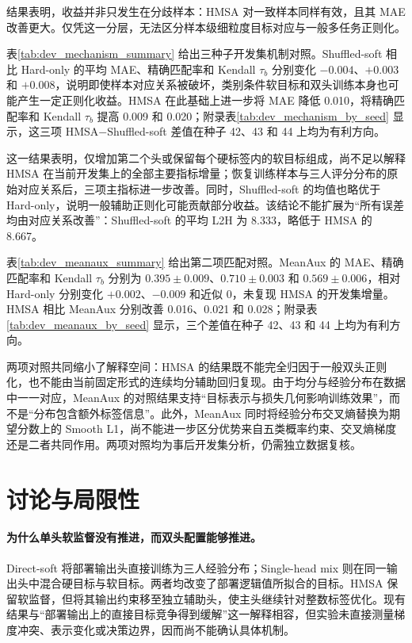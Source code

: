 \documentclass[UTF8,fontset=fandol,a4paper,11pt]{ctexart}
\begin{document}
结果表明，收益并非只发生在分歧样本：HMSA 对一致样本同样有效，且其 MAE 改善更大。仅凭这一分层，无法区分样本级细粒度目标对应与一般多任务正则化。

表\ref{tab:dev_mechanism_summary} 给出三种子开发集机制对照。Shuffled-soft 相比 Hard-only 的平均 MAE、精确匹配率和 Kendall $\tau_b$ 分别变化 $-0.004$、$+0.003$ 和 $+0.008$，说明即使样本对应关系被破坏，类别条件软目标和双头训练本身也可能产生一定正则化收益。HMSA 在此基础上进一步将 MAE 降低 0.010，将精确匹配率和 Kendall $\tau_b$ 提高 0.009 和 0.020；附录表\ref{tab:dev_mechanism_by_seed} 显示，这三项 HMSA$-$Shuffled-soft 差值在种子 42、43 和 44 上均为有利方向。



这一结果表明，仅增加第二个头或保留每个硬标签内的软目标组成，尚不足以解释 HMSA 在当前开发集上的全部主要指标增量；恢复训练样本与三人评分分布的原始对应关系后，三项主指标进一步改善。同时，Shuffled-soft 的均值也略优于 Hard-only，说明一般辅助正则化可能贡献部分收益。该结论不能扩展为“所有误差均由对应关系改善”：Shuffled-soft 的平均 L2H 为 8.333，略低于 HMSA 的 8.667。

表\ref{tab:dev_meanaux_summary} 给出第二项匹配对照。MeanAux 的 MAE、精确匹配率和 Kendall $\tau_b$ 分别为 $0.395\pm0.009$、$0.710\pm0.003$ 和 $0.569\pm0.006$，相对 Hard-only 分别变化 $+0.002$、$-0.009$ 和近似 0，未复现 HMSA 的开发集增量。HMSA 相比 MeanAux 分别改善 0.016、0.021 和 0.028；附录表\ref{tab:dev_meanaux_by_seed} 显示，三个差值在种子 42、43 和 44 上均为有利方向。



两项对照共同缩小了解释空间：HMSA 的结果既不能完全归因于一般双头正则化，也不能由当前固定形式的连续均分辅助回归复现。由于均分与经验分布在数据中一一对应，MeanAux 的对照结果支持“目标表示与损失几何影响训练效果”，而不是“分布包含额外标签信息”。此外，MeanAux 同时将经验分布交叉熵替换为期望分数上的 Smooth L1，尚不能进一步区分优势来自五类概率约束、交叉熵梯度还是二者共同作用。两项对照均为事后开发集分析，仍需独立数据复核。

\FloatBarrier

\section{讨论与局限性}

\paragraph{为什么单头软监督没有推进，而双头配置能够推进。}
Direct-soft 将部署输出头直接训练为三人经验分布；Single-head mix 则在同一输出头中混合硬目标与软目标。两者均改变了部署逻辑值所拟合的目标。HMSA 保留软监督，但将其输出约束移至独立辅助头，使主头继续针对整数标签优化。现有结果与“部署输出上的直接目标竞争得到缓解”这一解释相容，但实验未直接测量梯度冲突、表示变化或决策边界，因而尚不能确认具体机制。
\end{document}
